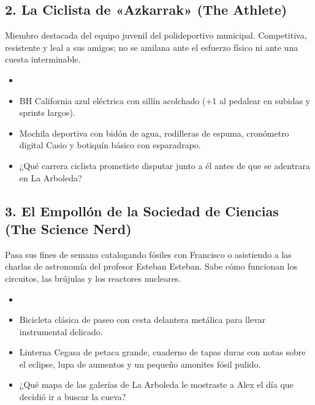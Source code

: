 \subsection{2. La Ciclista de «Azkarrak» (The Athlete)}
Miembro destacada del equipo juvenil del polideportivo municipal. Competitiva, resistente y leal a sus amigos; no se amilana ante el esfuerzo físico ni ante una cuesta interminable.
\begin{itemize}
  \item {}      
  \item {} BH California azul eléctrica con sillín acolchado (+1 al pedalear en subidas y sprints largos).
  \item {} Mochila deportiva con bidón de agua, rodilleras de espuma, cronómetro digital Casio y botiquín básico con esparadrapo.
  \item {} ¿Qué carrera ciclista prometiste disputar junto a él antes de que se adentrara en La Arboleda?
\end{itemize}

\subsection{3. El Empollón de la Sociedad de Ciencias (The Science Nerd)}
Pasa sus fines de semana catalogando fósiles con Francisco o asistiendo a las charlas de astronomía del profesor Esteban Esteban. Sabe cómo funcionan los circuitos, las brújulas y los reactores nucleares.
\begin{itemize}
  \item {}      
  \item {} Bicicleta clásica de paseo con cesta delantera metálica para llevar instrumental delicado.
  \item {} Linterna Cegasa de petaca grande, cuaderno de tapas duras con notas sobre el eclipse, lupa de aumentos y un pequeño amonites fósil pulido.
  \item {} ¿Qué mapa de las galerías de La Arboleda le mostraste a Alex el día que decidió ir a buscar la cueva?
\end{itemize}

